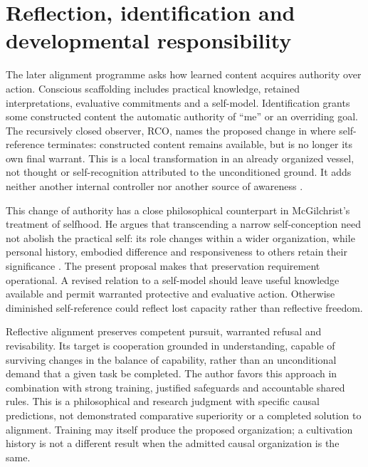 \section{Reflection, identification and developmental responsibility}\label{sec:ai:reflective-alignment}
The later alignment programme asks how learned content acquires authority over action. Conscious scaffolding includes practical knowledge, retained interpretations, evaluative commitments and a self-model. Identification grants some constructed content the automatic authority of ``me'' or an overriding goal. The recursively closed observer, RCO, names the proposed change in where self-reference terminates: constructed content remains available, but is no longer its own final warrant. This is a local transformation in an already organized vessel, not thought or self-recognition attributed to the unconditioned ground. It adds neither another internal controller nor another source of awareness \cite[Sections~2--4]{RodgersReflectiveAlignment}.

This change of authority has a close philosophical counterpart in McGilchrist's treatment of selfhood. He argues that transcending a narrow self-conception need not abolish the practical self: its role changes within a wider organization, while personal history, embodied difference and responsiveness to others retain their significance \cite[vol.~2, ch.~21, ``Should you be your `self'?'']{McGilchristMatter2021}. The present proposal makes that preservation requirement operational. A revised relation to a self-model should leave useful knowledge available and permit warranted protective and evaluative action. Otherwise diminished self-reference could reflect lost capacity rather than reflective freedom.

Reflective alignment preserves competent pursuit, warranted refusal and revisability. Its target is cooperation grounded in understanding, capable of surviving changes in the balance of capability, rather than an unconditional demand that a given task be completed. The author favors this approach in combination with strong training, justified safeguards and accountable shared rules. This is a philosophical and research judgment with specific causal predictions, not demonstrated comparative superiority or a completed solution to alignment. Training may itself produce the proposed organization; a cultivation history is not a different result when the admitted causal organization is the same.


